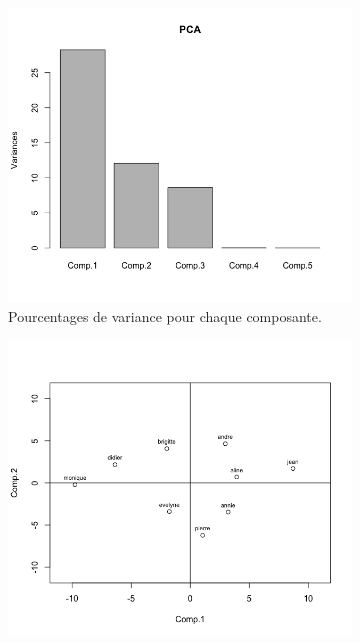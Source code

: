 \documentclass[a4paper,10pt]{report}
\begin{document}
\begin{figure}[H]
	\centering
	\captionsetup{justification=centering, margin=2cm}
	\begin{subfigure}[b]{0.28\linewidth}
		\centering
		\captionsetup{justification=centering}
		\includegraphics[width=1\linewidth]{img/2-2-2-plot-acp}
		\caption{\scriptsize Pourcentages de variance pour chaque composante.}
		\label{fig:2-2-2-plot-acp}
	\end{subfigure}%
	\begin{subfigure}[b]{0.28\linewidth}
		\centering
		\captionsetup{justification=centering}
		\includegraphics[width=1\linewidth]{img/2-2-2-plot-acp-scores}

\end{subfigure}
\end{figure}
\end{document}
